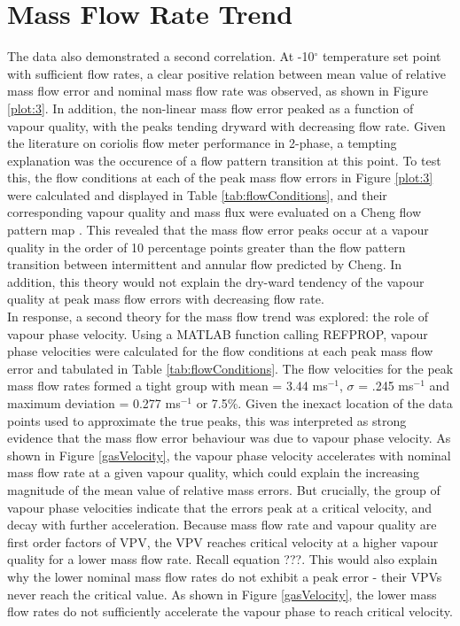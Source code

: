 \documentclass{report}
\begin{document}
\section{Mass Flow Rate Trend}
The data also demonstrated a second correlation. At -10$^\circ$ temperature set point with sufficient flow rates, a clear positive relation between mean value of relative mass flow error and nominal mass flow rate was observed, as shown in Figure \ref{plot:3}. In addition, the non-linear mass flow error peaked as a function of vapour quality, with the peaks tending dryward with decreasing flow rate. Given the literature on coriolis flow meter performance in 2-phase, a tempting explanation was the occurence of a flow pattern transition at this point. To test this, the flow conditions at each of the peak mass flow errors in Figure \ref{plot:3} were calculated and displayed in Table \ref{tab:flowConditions}, and their corresponding vapour quality and mass flux were evaluated on a Cheng flow pattern map \cite{Cheng 2008}. This revealed that the mass flow error peaks occur at a vapour quality in the order of 10 percentage points greater than the flow pattern transition between intermittent and annular flow predicted by Cheng. In addition, this theory would not explain the dry-ward tendency of the vapour quality at peak mass flow errors with decreasing flow rate.\\
In response, a second theory for the mass flow trend was explored: the role of vapour phase velocity. Using a MATLAB function calling REFPROP, vapour phase velocities were calculated for the flow conditions at each peak mass flow error and tabulated in Table \ref{tab:flowConditions}. The flow velocities for the peak mass flow rates formed a tight group with mean = 3.44 ms$^{-1}$, $\sigma$ = .245 ms$^{-1}$ and maximum deviation = 0.277 ms$^{-1}$ or 7.5\%. Given the inexact location of the data points used to approximate the true peaks, this was interpreted as strong evidence that the mass flow error behaviour was due to vapour phase velocity. As shown in Figure \ref{gasVelocity}, the vapour phase velocity accelerates with nominal mass flow rate at a given vapour quality, which could explain the increasing magnitude of the mean value of relative mass errors. But crucially, the group of vapour phase velocities indicate that the errors peak at a critical velocity, and decay with further acceleration. Because mass flow rate and vapour quality are first order factors of VPV, the VPV reaches critical velocity at a higher vapour quality for a lower mass flow rate. Recall equation ???. This would also explain why the lower nominal mass flow rates do not exhibit a peak error - their VPVs never reach the critical value. As shown in Figure \ref{gasVelocity}, the lower mass flow rates do not sufficiently accelerate the vapour phase to reach critical velocity.
\end{document}
